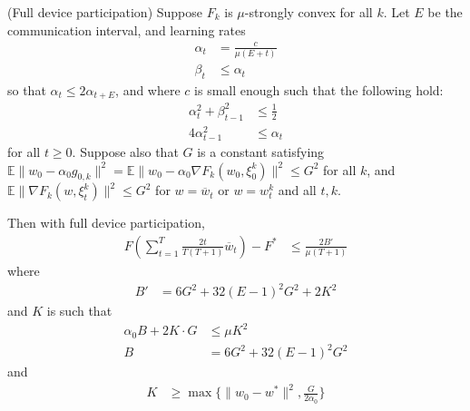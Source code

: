 \begin{theorem}
	(Full device participation) Suppose $F_{k}$ is $\mu$-strongly convex
	for all $k$. Let $E$ be the communication interval, and learning
	rates 
	\begin{align*}
	\alpha_{t} & =\frac{c}{\mu(E+t)}\\
	\beta_{t} & \leq\alpha_{t}
	\end{align*}
	so that $\alpha_{t}\leq2\alpha_{t+E}$, and where $c$ is small enough
	such that the following hold: 
	\begin{align*}
	\alpha_{t}^{2}+\beta_{t-1}^{2} & \leq\frac{1}{2}\\
	4\alpha_{t-1}^{2} & \leq\alpha_{t}
	\end{align*}
	for all $t\geq0$. Suppose also that $G$ is a constant satisfying
	$\mathbb{E}\|w_{0}-\alpha_{0}g_{0,k}\|^{2}=\mathbb{E}\|w_{0}-\alpha_{0}\nabla F_{k}(w_{0},\xi_{0}^{k})\|^{2}\leq G^{2}$
	for all $k$, and $\mathbb{E}\|\nabla F_{k}(w,\xi_{t}^{k})\|^{2}\leq G^{2}$
	for $w=\overline{w}_{t}$ or $w=w_{t}^{k}$ and all $t,k$.
	
	Then with full device participation, \textbf{
		\begin{align*}
		F(\sum_{t=1}^{T}\frac{2t}{T(T+1)}\overline{w}_{t})-F^{\ast} & \leq\frac{2B'}{\mu(T+1)}
		\end{align*}
	} where
	\begin{align*}
	B' & =6G^{2}+32(E-1)^{2}G^{2}+2K^{2}
	\end{align*}
	and $K$ is such that 
	\begin{align*}
	\alpha_{0}B+2K\cdot G & \leq\mu K^{2}\\
	B & =6G^{2}+32(E-1)^{2}G^{2}
	\end{align*}
	and
	\begin{align*}
	K & \geq\max\{\|w_{0}-w^{\ast}\|^{2},\frac{G}{2\alpha_{0}}\}
	\end{align*}
\end{theorem}
